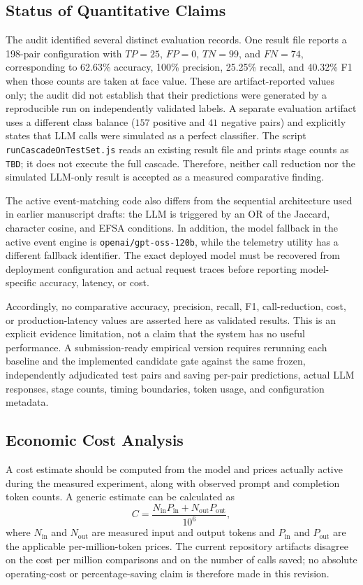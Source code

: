 \documentclass[sigconf,natbib=true,anonymous=true]{acmart}
\begin{document}
\subsection{Status of Quantitative Claims}
The audit identified several distinct evaluation records. One result file reports a 198-pair configuration with $TP=25$, $FP=0$, $TN=99$, and $FN=74$, corresponding to 62.63\% accuracy, 100\% precision, 25.25\% recall, and 40.32\% F1 when those counts are taken at face value. These are artifact-reported values only; the audit did not establish that their predictions were generated by a reproducible run on independently validated labels. A separate evaluation artifact uses a different class balance ($157$ positive and $41$ negative pairs) and explicitly states that LLM calls were simulated as a perfect classifier. The script \texttt{runCascadeOnTestSet.js} reads an existing result file and prints stage counts as \texttt{TBD}; it does not execute the full cascade. Therefore, neither call reduction nor the simulated LLM-only result is accepted as a measured comparative finding.

The active event-matching code also differs from the sequential architecture used in earlier manuscript drafts: the LLM is triggered by an OR of the Jaccard, character cosine, and EFSA conditions. In addition, the model fallback in the active event engine is \texttt{openai/gpt-oss-120b}, while the telemetry utility has a different fallback identifier. The exact deployed model must be recovered from deployment configuration and actual request traces before reporting model-specific accuracy, latency, or cost.

Accordingly, no comparative accuracy, precision, recall, F1, call-reduction, cost, or production-latency values are asserted here as validated results. This is an explicit evidence limitation, not a claim that the system has no useful performance. A submission-ready empirical version requires rerunning each baseline and the implemented candidate gate against the same frozen, independently adjudicated test pairs and saving per-pair predictions, actual LLM responses, stage counts, timing boundaries, token usage, and configuration metadata.

\subsection{Economic Cost Analysis}
A cost estimate should be computed from the model and prices actually active during the measured experiment, along with observed prompt and completion token counts. A generic estimate can be calculated as
\begin{equation}
C = \frac{N_{\mathrm{in}}P_{\mathrm{in}}+N_{\mathrm{out}}P_{\mathrm{out}}}{10^6},
\label{eq:cost}
\end{equation}
where $N_{\mathrm{in}}$ and $N_{\mathrm{out}}$ are measured input and output tokens and $P_{\mathrm{in}}$ and $P_{\mathrm{out}}$ are the applicable per-million-token prices. The current repository artifacts disagree on the cost per million comparisons and on the number of calls saved; no absolute operating-cost or percentage-saving claim is therefore made in this revision.
\end{document}
